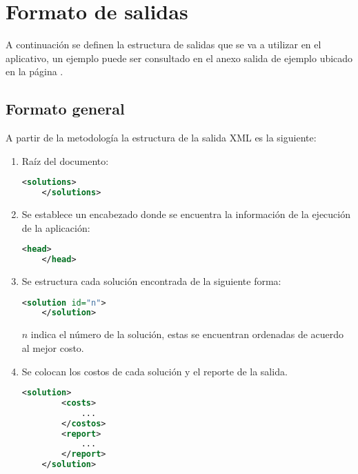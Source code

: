 
\section{Formato de salidas} \label{sec:formatSal}

A continuación se definen la estructura de salidas que se va a utilizar en el aplicativo, un ejemplo puede ser consultado en el anexo salida de ejemplo ubicado en la página \pageref{ejemploSalida}.

\subsection{Formato general}

A partir de la metodología la estructura de la salida XML es la siguiente:

\begin{enumerate}
	\item{Raíz del documento:

	\lstset{frameround=fttt}
	\begin{lstlisting}[frame=trBL, language=XML]
	<solutions>
	</solutions>
	\end{lstlisting}}

	\item{Se establece un encabezado donde se encuentra la información de la ejecución de la aplicación:

	\lstset{frameround=fttt}
	\begin{lstlisting}[frame=trBL, language=XML]
	<head>
	</head>
	\end{lstlisting}}
	
	\item{Se estructura cada solución encontrada de la siguiente forma:

	\lstset{frameround=fttt}
	\begin{lstlisting}[frame=trBL, language=XML]
	<solution id="n">
	</solution>
	\end{lstlisting}}	
	
	$n$ indica el número de la solución, estas se encuentran ordenadas de acuerdo al mejor costo.

	\item{Se colocan los costos de cada solución y el reporte de la salida.

	\lstset{frameround=fttt}
	\begin{lstlisting}[frame=trBL, language=XML]
	<solution>
		<costs>
			...
		</costos>
		<report>
			...
		</report>
	</solution>
	\end{lstlisting}}
\end{enumerate}

